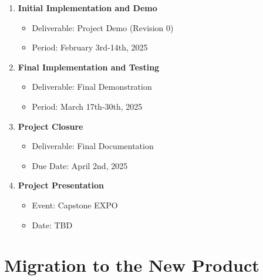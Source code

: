 \documentclass[12pt]{article}
\begin{document}
\begin{enumerate}
  \item \textbf{Initial Implementation and Demo}
    \begin{itemize}
      \item Deliverable: Project Demo (Revision 0)
      \item Period: February 3rd-14th, 2025
    \end{itemize}

  \item \textbf{Final Implementation and Testing}
    \begin{itemize}
      \item Deliverable: Final Demonstration
      \item Period: March 17th-30th, 2025
    \end{itemize}

  \item \textbf{Project Closure}
    \begin{itemize}
      \item Deliverable: Final Documentation
      \item Due Date: April 2nd, 2025
    \end{itemize}

  \item \textbf{Project Presentation}
    \begin{itemize}
      \item Event: Capstone EXPO
      \item Date: TBD
    \end{itemize}
\end{enumerate}

\section{Migration to the New Product}
\end{document}
